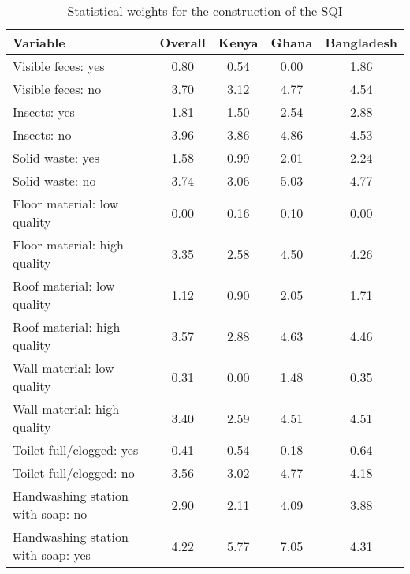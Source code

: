 \begin{table}[ht]

\caption{\label{tab:weights}Statistical weights for the construction of the SQI}
\centering
\begin{tabular}[t]{lcccc}
\toprule
Variable & Overall & Kenya & Ghana & Bangladesh\\
\midrule
Visible feces: yes & 0.80 & 0.54 & 0.00 & 1.86\\
Visible feces: no & 3.70 & 3.12 & 4.77 & 4.54\\
Insects: yes & 1.81 & 1.50 & 2.54 & 2.88\\
Insects: no & 3.96 & 3.86 & 4.86 & 4.53\\
Solid waste: yes & 1.58 & 0.99 & 2.01 & 2.24\\
Solid waste: no & 3.74 & 3.06 & 5.03 & 4.77\\
Floor material: low quality & 0.00 & 0.16 & 0.10 & 0.00\\
Floor material: high quality & 3.35 & 2.58 & 4.50 & 4.26\\
Roof material: low quality & 1.12 & 0.90 & 2.05 & 1.71\\
Roof material: high quality & 3.57 & 2.88 & 4.63 & 4.46\\
Wall material: low quality & 0.31 & 0.00 & 1.48 & 0.35\\
Wall material: high quality & 3.40 & 2.59 & 4.51 & 4.51\\
Toilet full/clogged: yes & 0.41 & 0.54 & 0.18 & 0.64\\
Toilet full/clogged: no & 3.56 & 3.02 & 4.77 & 4.18\\
Handwashing station with soap: no & 2.90 & 2.11 & 4.09 & 3.88\\
Handwashing station with soap: yes & 4.22 & 5.77 & 7.05 & 4.31\\
\bottomrule
\end{tabular}
\end{table}